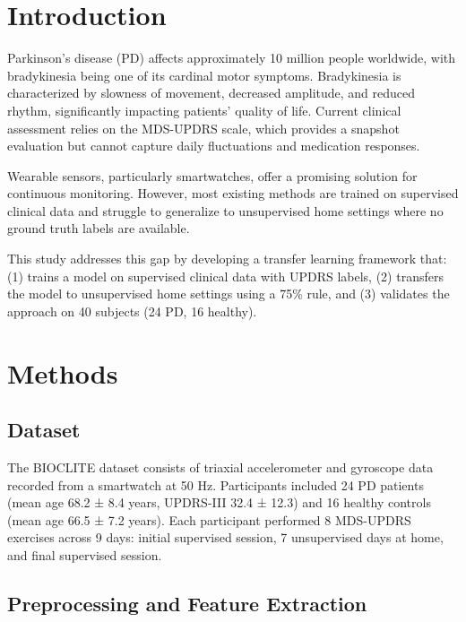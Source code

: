 \documentclass{article}
\begin{document}
\section{Introduction}

Parkinson's disease (PD) affects approximately 10 million people worldwide, with bradykinesia being one of its cardinal motor symptoms. Bradykinesia is characterized by slowness of movement, decreased amplitude, and reduced rhythm, significantly impacting patients' quality of life. Current clinical assessment relies on the MDS-UPDRS scale, which provides a snapshot evaluation but cannot capture daily fluctuations and medication responses.

Wearable sensors, particularly smartwatches, offer a promising solution for continuous monitoring. However, most existing methods are trained on supervised clinical data and struggle to generalize to unsupervised home settings where no ground truth labels are available.

This study addresses this gap by developing a transfer learning framework that: (1) trains a model on supervised clinical data with UPDRS labels, (2) transfers the model to unsupervised home settings using a 75\% rule, and (3) validates the approach on 40 subjects (24 PD, 16 healthy).

\section{Methods}

\subsection{Dataset}

The BIOCLITE dataset consists of triaxial accelerometer and gyroscope data recorded from a smartwatch at 50 Hz. Participants included 24 PD patients (mean age 68.2 ± 8.4 years, UPDRS-III 32.4 ± 12.3) and 16 healthy controls (mean age 66.5 ± 7.2 years). Each participant performed 8 MDS-UPDRS exercises across 9 days: initial supervised session, 7 unsupervised days at home, and final supervised session.

\subsection{Preprocessing and Feature Extraction}
\end{document}
